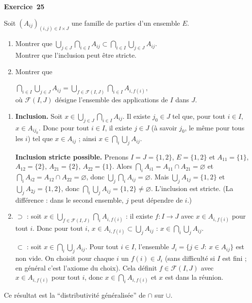 \documentclass[11pt,a4paper]{article}
\begin{document}
	\medskip\noindent\textbf{\Large\color{bleu}Exercice~25}\nopagebreak
	\begin{enonce}
		Soit $(A_{ij})_{(i,j)\in I\times J}$ une famille de parties
		d'un ensemble $E$.
		
		\begin{enumerate}
			\item Montrer que
			$
			\bigcup_{j\in J}\bigcap_{i\in I} A_{ij}
			\subset
			\bigcap_{i\in I}\bigcup_{j\in J} A_{ij}.
			$\\
			Montrer que l'inclusion peut être stricte.
			\item Montrer que
			
			$	\bigcap_{i\in I}\bigcup_{j\in J} A_{ij}
			=
			\bigcup_{f\in\mathcal{F}(I,J)}
			\bigcap_{i\in I} A_{i,f(i)},$\\
			
			où $\mathcal{F}(I,J)$ désigne l'ensemble des applications
			de $I$ dans $J$.
		\end{enumerate}
	\end{enonce}
	\begin{corrige}
		\begin{enumerate}
			\item \textbf{Inclusion.} Soit $x\in\bigcup_{j\in J}\bigcap_{i\in I}A_{ij}$. Il existe $j_0\in J$ tel que, pour tout $i\in I$, $x\in A_{ij_0}$. Donc pour tout $i\in I$, il existe $j\in J$ (à savoir $j_0$, le même pour tous les $i$) tel que $x\in A_{ij}$ ; ainsi $x\in\bigcap_{i}\bigcup_{j}A_{ij}$.
			
			\textbf{Inclusion stricte possible.} Prenons $I=J=\{1,2\}$, $E=\{1,2\}$ et $A_{11}=\{1\}$, $A_{12}=\{2\}$, $A_{21}=\{2\}$, $A_{22}=\{1\}$. Alors $\bigcap_iA_{i1}=A_{11}\cap A_{21}=\varnothing$ et $\bigcap_iA_{i2}=A_{12}\cap A_{22}=\varnothing$, donc $\bigcup_j\bigcap_iA_{ij}=\varnothing$. Mais $\bigcup_jA_{1j}=\{1,2\}$ et $\bigcup_jA_{2j}=\{1,2\}$, donc $\bigcap_i\bigcup_jA_{ij}=\{1,2\}\neq\varnothing$. L'inclusion est stricte. (La différence : dans le second ensemble, $j$ peut dépendre de $i$.)
			\item \textbf{$\supset$} : soit $x\in\bigcup_{f\in\mathcal F(I,J)}\bigcap_iA_{i,f(i)}$ : il existe $f:I\to J$ avec $x\in A_{i,f(i)}$ pour tout $i$. Donc pour tout $i$, $x\in A_{i,f(i)}\subset\bigcup_jA_{ij}$ : $x\in\bigcap_i\bigcup_jA_{ij}$.
			
			\textbf{$\subset$} : soit $x\in\bigcap_i\bigcup_jA_{ij}$. Pour tout $i\in I$, l'ensemble $J_i=\{j\in J:\ x\in A_{ij}\}$ est non vide. On choisit pour chaque $i$ un $f(i)\in J_i$ (sans difficulté si $I$ est fini ; en général c'est l'axiome du choix). Cela définit $f\in\mathcal F(I,J)$ avec $x\in A_{i,f(i)}$ pour tout $i$, donc $x\in\bigcap_iA_{i,f(i)}$ et $x$ est dans la réunion.
		\end{enumerate}
		Ce résultat est la ``distributivité généralisée'' de $\cap$ sur $\cup$.
	\end{corrige}
	
\end{document}

